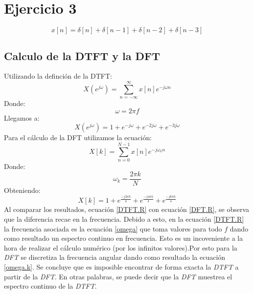 \documentclass[letterpaper]{article}
\begin{document}
\section{Ejercicio 3}

\begin{equation}
    x[n]=\delta[n]+\delta[n-1]+\delta[n-2]+\delta[n-3]
\end{equation}

\subsection{Calculo de la DTFT y la DFT}

Utilizando la definción de la DTFT:
\begin{equation}
    X(e^{j\omega})=\sum_{n=-\infty}^{\infty}x[n]e^{-j\omega n}
\end{equation}
Donde:
\begin{equation}
    \label{omega}
    \omega=2\pi f
\end{equation}
Llegamos a:
\begin{equation}
    \label{DTFT.R}
    X(e^{j\omega})=1+e^{-j\omega}+e^{-2j\omega}+e^{-3j\omega}
\end{equation}
Para el cálculo de la DFT utilizamos la ecuación:
\begin{equation}
    X[k]=\sum_{n=0}^{N-1}x[n]e^{-j\omega_k n}
\end{equation}
Donde:
\begin{equation}
    \label{omega.k}
    \omega_k=\frac{2\pi k}{N}
\end{equation}
Obteniendo:
\begin{equation}
    \label{DFT.R}
    X[k]=1+e^{\frac{-j2\pi k }{4}}+e^{\frac{-j4\pi k}{4}}+e^{\frac{-j6\pi k}{4}}
\end{equation}
Al comparar los resultados, ecuación \ref{DTFT.R} con ecuación \ref{DFT.R}, se observa que la diferencia recae en la frecuencia. Debido a esto, en la ecuación 
\ref{DTFT.R} la frecuencia asociada es la ecuación \ref{omega} que toma valores para todo $f$ dando como resultado un espectro continuo en frecuencia. Esto es un incoveniente a la hora 
de realizar el cálculo numérico (por los infinitos valores).Por esto para la \textit{DFT} se discretiza la frecuencia angular dando como resultado la ecuación \ref{omega.k}. Se concluye que es imposible encontrar de forma exacta la \textit{DTFT} a partir de la \textit{DFT}. En otras palabras, se puede decir que 
la \textit{DFT} muestrea el espectro continuo de la \textit{DTFT}.
\end{document}
